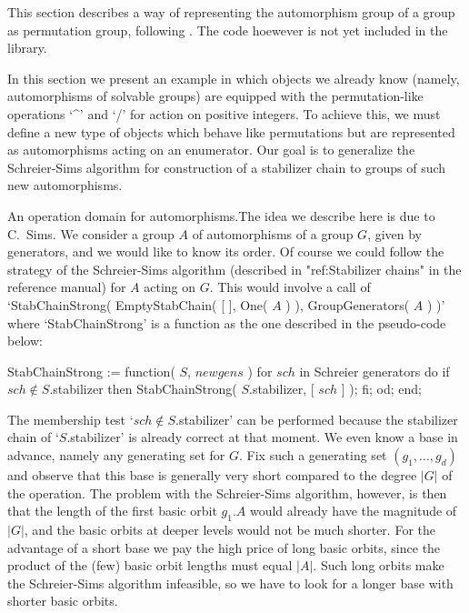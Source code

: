 \endgroup%


This section describes a way of representing the automorphism group of a
group as permutation group, following \cite{Sims97}. The code hoewever is
not yet included in the {\GAP} library.

In this section  we present an example in  which objects we  already know
(namely,  automorphisms  of   solvable  groups)   are  equipped  with the
permutation-like operations `^' and `/'  for action on positive integers.
To achieve this, we must  define a new  type of objects which behave like
permutations   but are  represented     as automorphisms  acting  on   an
enumerator.  Our  goal is to  generalize  the Schreier-Sims algorithm for
construction of a stabilizer chain to groups of such new automorphisms.

{\bsf  An operation domain for automorphisms.}\quad  The idea we describe
here is due  to C.~Sims. We consider  a group $A$  of  automorphisms of a
group $G$, given by generators,  and we would like  to know its order. Of
course we  could   follow the strategy  of  the   Schreier-Sims algorithm
(described  in "ref:Stabilizer chains"  in  the reference manual) for $A$
acting   on   $G$. This would    involve   a  call  of  `StabChainStrong(
EmptyStabChain( [   ],  One( $A$ ) ),   GroupGenerators(  $A$ ) )'  where
`StabChainStrong'  is a function as the  one described in the pseudo-code
below:

StabChainStrong := function( $S$, $newgens$ )
\quad for $sch$  in {\rm Schreier generators}  do
\qquad if $sch \notin S$.stabilizer  then
\qquad\quad StabChainStrong( $S$.stabilizer, [ $sch$ ] );
\qquad fi;
\quad od;
end;

The membership test `$sch  \notin S$.stabilizer' can be performed because
the  stabilizer chain  of `$S$.stabilizer'  is   already correct at  that
moment. We  even know a base  in advance, namely  any  generating set for
$G$. Fix such  a generating set  $(g_1,\ldots,g_d)$ and observe that this
base  is  generally very   short compared  to   the degree $|G|$  of  the
operation. The problem with the Schreier-Sims algorithm, however, is then
that the length of the first  basic orbit $g_1.A$  would already have the
magnitude of $|G|$,  and the basic orbits at  deeper levels would  not be
much shorter. For the advantage of a short base  we pay the high price of
long basic  orbits, since the  product of  the  (few) basic orbit lengths
must  equal $|A|$.  Such  long  orbits  make the Schreier-Sims  algorithm
infeasible,   so we have to   look for a  longer base  with shorter basic
orbits.

